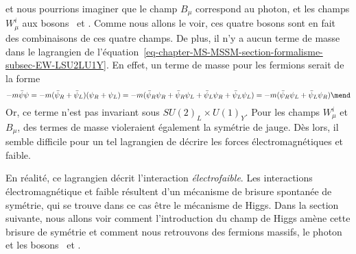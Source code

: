 et nous pourrions imaginer que le champ $B_\mu$ correspond au photon, et les champs $W^i_\mu$ aux bosons \Wbosonpm\ et \Zboson. Comme nous allons le voir, ces quatre bosons sont en fait des combinaisons de ces quatre champs.
De plus, il n'y a aucun terme de masse dans le lagrangien de l'équation~\eqref{eq-chapter-MS-MSSM-section-formalisme-subsec-EW-LSU2LU1Y}. En effet, un terme de masse pour les fermions serait de la forme
\begin{equation}
-m\bar{\psi}\psi
=
-m (\bar{\psi}_R+\bar{\psi}_L)(\psi_R+\psi_L)
=
-m (
\bar{\psi}_R \psi_R
+\bar{\psi}_R \psi_L
+\bar{\psi}_L \psi_R
+\bar{\psi}_L \psi_L
)
=
-m (\bar{\psi}_R \psi_L + \bar{\psi}_L \psi_R)
\mend
\end{equation}
Or, ce terme n'est pas invariant sous $SU(2)_L\times U(1)_Y$.
Pour les champs $W^i_\mu$ et $B_\mu$, des termes de masse violeraient également la symétrie de jauge.
Dès lors, il semble difficile pour un tel lagrangien de décrire les forces électromagnétiques et faible.
\par En réalité, ce lagrangien décrit l'interaction \emph{électrofaible}.
Les interactions électromagnétique et faible résultent d'un mécanisme de brisure spontanée de symétrie, qui se trouve dans ce cas être le mécanisme de Higgs.
Dans la section suivante, nous allons voir comment l'introduction du champ de Higgs amène cette brisure de symétrie et comment nous retrouvons des fermions massifs, le photon et les bosons \Wbosonpm\ et \Zboson.